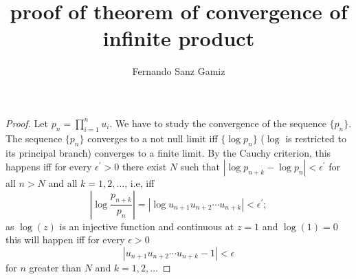 \documentclass[12pt]{article}
\newcommand{\abs}[1]{\left\vert#1\right\vert}
\begin{document}
\title{proof of theorem of convergence of infinite product}%
\author{Fernando Sanz Gamiz}%

\begin{proof}
Let $p_n=\prod_{i=1}^n u_i$. We have to study the convergence of the
sequence $\{p_n\}$. The sequence $\{p_n\}$ converges to a not null limit iff
$\{\log p_n\}$ ($\log$ is restricted to its principal branch) converges
to a finite limit. By the Cauchy criterion, this happens iff for
every $\epsilon^{\prime}>0$ there exist $N$ such that $\abs{\log
p_{n+k} - \log p_n} < \epsilon^{\prime}$ for all $n>N$ and all
$k=1,2,\ldots$, i.e, iff
$$\abs{\log \frac{p_{n+k}}{p_n}} = \abs{\log u_{n+1}u_{n+2}\cdots u_{n+k}} < \epsilon^{\prime};$$
as $\log(z)$ is an injective function and continuous at $z=1$ and
$\log(1)=0$ this will happen iff for every $\epsilon>0$
$$\abs{u_{n+1}u_{n+2}\cdots u_{n+k}-1} < \epsilon$$ for $n$ greater
than $N$ and $k=1,2,\ldots$
\end{proof}
\end{document}

